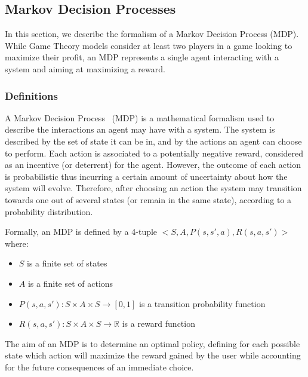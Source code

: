 \subsection{Markov Decision Processes}
In this section, we describe the formalism of a Markov Decision Process (MDP).
While Game Theory models consider at least two players in a game looking to maximize their profit, an MDP represents a single agent interacting with a system and aiming at maximizing a reward. 

\subsubsection{Definitions}
A Markov Decision Process~\cite{bellman1957} (MDP) is a mathematical formalism used to describe the interactions an agent may have with a system.
The system is described by the set of state it can be in, and by the actions an agent can choose to perform.
Each action is associated to a potentially negative reward, considered as an incentive (or deterrent) for the agent.
However, the outcome of each action is probabilistic thus incurring a certain amount of uncertainty about how the system will evolve.
Therefore, after choosing an action the system may transition towards one out of several states (or remain in the same state), according to a probability distribution.


Formally, an MDP is defined by a 4-tuple $<S,A,P(s,s',a),R(s,a,s')>$ where:
\begin{itemize}
    \item $S$ is a finite set of states
    \item $A$ is a finite set of actions
    \item $P(s,a,s') : S \times A \times S \longrightarrow [0,1]$ is a transition probability function
    \item $R(s,a,s') : S \times A \times S \longrightarrow \mathbb{R}$ is a reward function
\end{itemize}

The aim of an MDP is to determine an optimal policy, defining for each possible state which action will maximize the reward gained by the user while accounting for the future consequences of an immediate choice.

